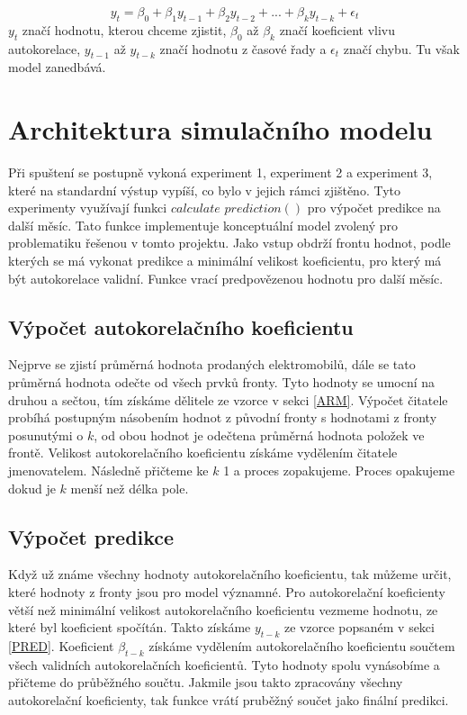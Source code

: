 \documentclass[14pt]{extarticle}
\begin{document}
	    $$y_t = {\beta}_0 + {\beta}_1 y_{t-1} + {\beta}_2 y_{t-2} + ... + {\beta}_k y_{t-k} + \epsilon_t$$ $y_t$ značí hodnotu, kterou chceme zjistit, ${\beta}_{0}$ až ${\beta}_{k}$ značí koeficient vlivu autokorelace, $y_{t-1}$ až $y_{t-k}$ značí hodnotu z časové řady a $\epsilon_t$ značí chybu. Tu však model zanedbává.
	   
    \section{Architektura simulačního modelu}
    
    Při spuštení se postupně vykoná experiment 1, experiment 2 a experiment 3, které na standardní výstup vypíší, co bylo v jejich rámci zjištěno. Tyto experimenty využívají funkci $calculate$ $prediction()$ pro výpočet predikce na další měsíc. Tato funkce implementuje konceptuální model zvolený pro problematiku řešenou v tomto projektu. Jako vstup obdrží frontu hodnot, podle kterých se má vykonat predikce a minimální velikost koeficientu, pro který má být autokorelace validní. Funkce vrací predpovězenou hodnotu pro další měsíc.
    
    \subsection{Výpočet autokorelačního koeficientu}
    Nejprve se zjistí průměrná hodnota prodaných elektromobilů, dále se tato průměrná hodnota odečte od všech prvků fronty. Tyto hodnoty se umocní na druhou a sečtou, tím získáme dělitele ze vzorce v sekci \ref{ARM}. Výpočet čitatele probíhá postupným násobením hodnot z původní fronty s hodnotami z fronty posunutými o $k$, od obou hodnot je odečtena průměrná hodnota položek ve frontě. Velikost autokorelačního koeficientu získáme vydělením čitatele jmenovatelem. Následně přičteme ke $k$ 1 a proces zopakujeme. Proces opakujeme dokud je $k$ menší než délka pole.
    
    \subsection{Výpočet predikce}
    Když už známe všechny hodnoty autokorelačního koeficientu, tak můžeme určit, které hodnoty z fronty jsou pro model významné. Pro autokorelační koeficienty větší než minimální velikost autokorelačního koeficientu vezmeme hodnotu, ze které byl koeficient spočítán. Takto získáme $y_{t-k}$ ze vzorce popsaném v sekci \ref{PRED}. Koeficient $\beta_{t-k}$ získáme vydělením autokorelačního koeficientu součtem všech validních autokorelačních koeficientů. Tyto hodnoty spolu vynásobíme a přičteme do průběžného součtu. Jakmile jsou takto zpracovány všechny autokorelační koeficienty, tak funkce vrátí pruběžný součet jako finální predikci.
    
\end{document}
